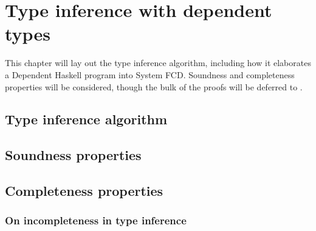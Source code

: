 \chapter{Type inference with dependent types}
\label{cha:type-inference}

\begin{proposal}
This chapter will lay out the type inference algorithm, including how it
elaborates a Dependent Haskell program into System FCD. Soundness and
completeness properties will be considered, though the bulk of the proofs
will be deferred to .
\end{proposal}

\section{Type inference algorithm}

\section{Soundness properties}

\section{Completeness properties}

\subsection{On incompleteness in type inference}
\label{sec:incomplete}
